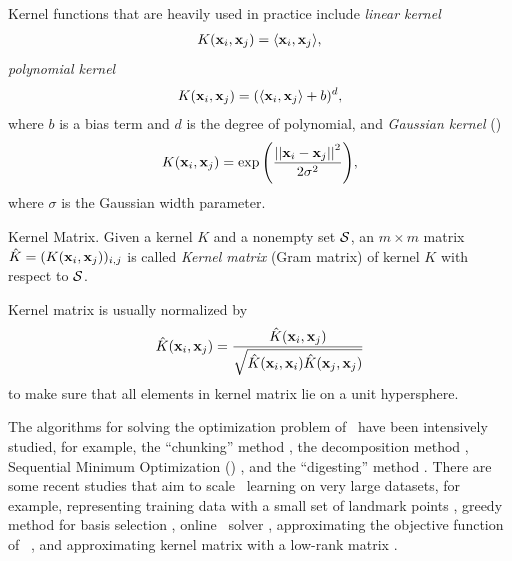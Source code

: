 {Kernel functions that are heavily used in practice include \textit{linear kernel}
\begin{align*}
	K(\mathbf {x}_i,\mathbf {x}_j) = \langle \mathbf {x}_i, \mathbf {x}_j \rangle,
\end{align*}
\textit{polynomial kernel}
\begin{align*}
	K(\mathbf {x}_i,\mathbf {x}_j) = (\langle \mathbf {x}_i, \mathbf {x}_j \rangle + b)^d,
\end{align*}
where $b$ is a bias term and $d$ is the degree of polynomial, and \textit{Gaussian kernel} (\rbf)
\begin{align*}
	K(\mathbf {x}_i,\mathbf {x}_j) = \exp{\left(\frac{\left|\left| {\mathbf {x}_i}-{\mathbf {x}_j} \right|\right|^2}{2\sigma^2}\right)},
\end{align*}
where $\sigma$ is the Gaussian width parameter.
\begin{definition}{Kernel Matrix.}
	Given a kernel $K$ and a nonempty set $\mathcal{S}$, an $m\times m$ matrix $\hat{K}=(K(\mathbf {x}_i,\mathbf {x}_j))_{i,j}$ is called \textit{Kernel matrix} (Gram matrix) of kernel $K$ with respect to $\mathcal{S}$.
\end{definition}
\noindent
Kernel matrix is usually normalized by
\begin{align*}
	\hat{K}(\mathbf {x}_i,\mathbf {x}_j) = \frac{\hat{K}(\mathbf {x}_i,\mathbf {x}_j)}{\sqrt{\hat{K}(\mathbf {x}_i,\mathbf {x}_i)\hat{K}(\mathbf {x}_j,\mathbf {x}_j)}}
\end{align*}
to make sure that all elements in kernel matrix lie on a unit hypersphere.

The algorithms for solving the optimization problem of \svm\ have been intensively studied, for example, 
the ``chunking'' method \citep{Vapnik82estimation,Perezcruz04double}, 
the decomposition method \citep{Osuna97an,Joachims98making}, 
{Sequential Minimum Optimization} (\smo) \citep{Platt98sequential,Platt99fast}, 
and the ``digesting'' method \citep{Decoste02support}.
There are some recent studies that aim to scale \svm\ learning on very large datasets, for example, 
representing training data with a small set of landmark points \citep{Pavlov00towards,Boley04training,Yu05making,Zhang08improved}, 
greedy method for basis selection \citep{Keerthi06building}, 
online \svm\ solver \citep{Bordes05fast}, 
approximating the objective function of \svm\ \citep{Zhang12scaling, Le13fast}, 
and approximating kernel matrix with a low-rank matrix \citep{Smola00sparse,Fine02efficient,Drineas05on,Si14memory}.



}
